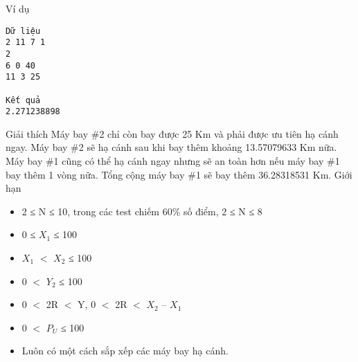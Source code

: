 Ví dụ  
\begin{verbatim}
Dữ liệu
2 11 7 1
2
6 0 40
11 3 25	

Kết quả
2.271238898
\end{verbatim}
   Giải thích  
Máy bay \#2 chỉ còn bay được 25 Km và phải được ưu tiên hạ cánh ngay. Máy bay \#2 sẽ hạ cánh sau khi bay thêm khoảng 13.57079633 Km nữa. Máy bay \#1 cũng có thể hạ cánh ngay nhưng sẽ an toàn hơn nếu máy bay \#1 bay thêm 1 vòng nữa. Tổng cộng máy bay \#1 sẽ bay thêm 36.28318531 Km.
   Giới hạn  
\begin{itemize}
	\item     2 ≤ N ≤ 10, trong các test chiếm 60\% số điểm, 2 ≤ N ≤ 8   
	\item     0 ≤ $X_{1}$    ≤ 100   
	\item     $X_{1}$    $<$ $X_{2}$    ≤ 100   
	\item     0 $<$ $Y_{2}$    ≤ 100   
	\item     0 $<$ 2R $<$ Y, 0 $<$ 2R $<$ $X_{2}$    – $X_{1}$
	\item     0 $<$ $P_{U}$    ≤ 100   
	\item     Luôn có một cách sắp xếp các máy bay hạ cánh.   
\end{itemize}